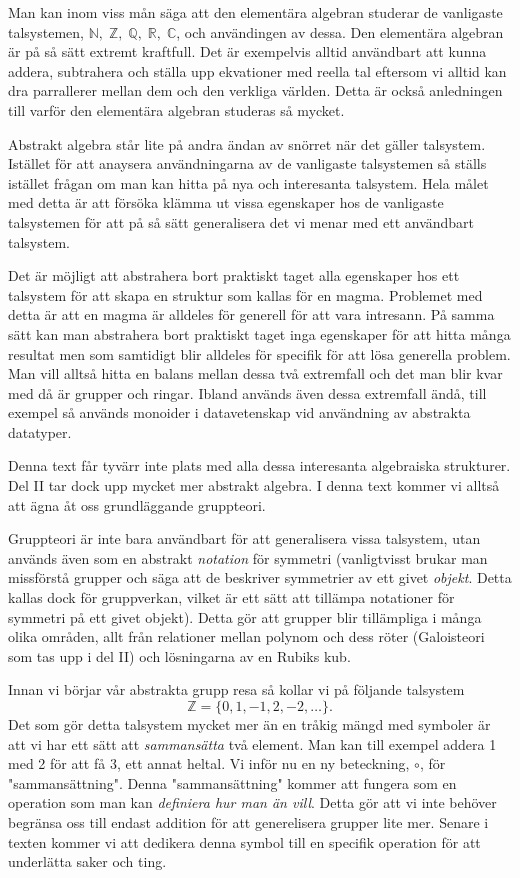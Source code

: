 \documentclass{article}
\theoremstyle{definition}
\begin{document}
Man kan inom viss mån säga att den elementära algebran studerar de 
vanligaste talsystemen, $\mathbb{N}, \; \mathbb{Z}, \; \mathbb{Q}, \; \mathbb{R}, \; \mathbb{C}$,
och användingen av dessa.
Den elementära algebran är på så sätt 
extremt kraftfull. Det är exempelvis alltid användbart att kunna addera, subtrahera och 
ställa upp ekvationer 
med reella tal eftersom vi alltid kan dra parrallerer mellan dem
och den verkliga världen. Detta är också anledningen till varför den elementära algebran
studeras så mycket. 

Abstrakt algebra står lite på andra ändan av snörret när det gäller 
talsystem. Istället för att anaysera användningarna av de vanligaste talsystemen så 
ställs istället frågan om man kan hitta på nya och interesanta talsystem. Hela målet med detta är att försöka klämma ut vissa egenskaper hos de vanligaste 
talsystemen för att på så sätt generalisera det vi menar med ett användbart talsystem.

Det är möjligt att abstrahera bort praktiskt taget alla egenskaper hos ett talsystem för att skapa en struktur som kallas för en magma. Problemet med detta är att en
magma är alldeles för generell för att vara intresann. På samma sätt kan man abstrahera bort praktiskt taget inga egenskaper för att hitta
många resultat men som samtidigt blir alldeles för specifik för att lösa generella problem. Man vill alltså hitta en balans mellan dessa två extremfall och det man blir kvar med då är grupper och 
ringar. Ibland används även dessa extremfall ändå, till exempel så används monoider i datavetenskap vid användning av abstrakta datatyper. 

Denna text får tyvärr inte plats med alla dessa interesanta algebraiska strukturer. Del II tar dock upp mycket mer abstrakt algebra.
I denna text kommer vi alltså att ägna åt oss grundläggande gruppteori. 

Gruppteori är inte bara användbart för att generalisera vissa talsystem, utan används även som en abstrakt \textit{notation} för symmetri (vanligtvisst brukar man 
missförstå grupper och säga att de beskriver symmetrier av ett givet \textit{objekt}. Detta kallas dock för gruppverkan, vilket är ett sätt att tillämpa notationer för symmetri på ett givet objekt).
Detta gör att grupper blir tillämpliga i många olika områden, allt från relationer mellan polynom och dess röter (Galoisteori som tas upp i del II) och 
lösningarna av en Rubiks kub.

Innan vi börjar vår abstrakta grupp resa så kollar vi på följande talsystem
\[ \mathbb{Z} = \{0, 1, -1, 2, -2, \ldots\}. \]
Det som gör detta talsystem mycket mer än en tråkig mängd med symboler är att 
vi har ett sätt att \textit{sammansätta} två element. Man kan till exempel 
addera 1 med 2 för att få 3, ett annat heltal.
Vi inför nu en ny beteckning, $\circ$, för "sammansättning". Denna "sammansättning" kommer 
att fungera som en operation som man kan \textit{definiera hur man än vill}. Detta gör att vi inte behöver begränsa oss till endast addition för att generelisera grupper lite mer. 
Senare i texten kommer vi att dedikera denna symbol till en specifik operation för att underlätta saker och ting. 
\end{document}
